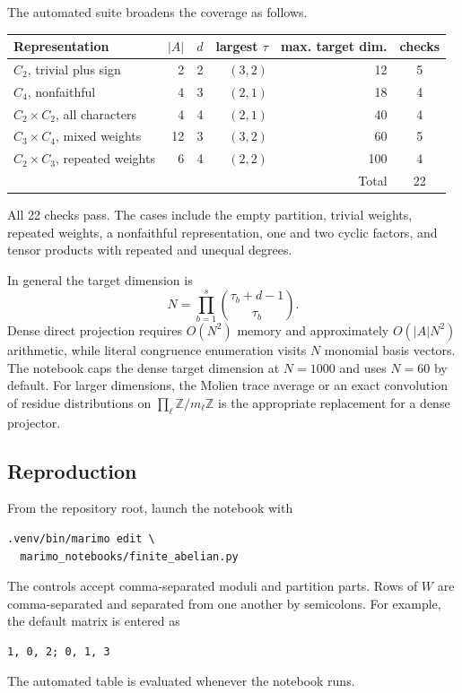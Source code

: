 \documentclass[10pt]{article}
\begin{document}
The automated suite broadens the coverage as follows.
\begin{center}
\small
\begin{tabular}{@{}lrrrrc@{}}
\toprule
Representation & $|A|$ & $d$ & largest $\tau$ & max. target dim. & checks \\
\midrule
$C_2$, trivial plus sign & 2 & 2 & $(3,2)$ & 12 & 5 \\
$C_4$, nonfaithful & 4 & 3 & $(2,1)$ & 18 & 4 \\
$C_2\times C_2$, all characters & 4 & 4 & $(2,1)$ & 40 & 4 \\
$C_3\times C_4$, mixed weights & 12 & 3 & $(3,2)$ & 60 & 5 \\
$C_2\times C_3$, repeated weights & 6 & 4 & $(2,2)$ & 100 & 4 \\
\midrule
\multicolumn{5}{r}{Total} & 22 \\
\bottomrule
\end{tabular}
\end{center}
All 22 checks pass.  The cases include the empty partition, trivial weights,
repeated weights, a nonfaithful representation, one and two cyclic factors,
and tensor products with repeated and unequal degrees.

In general the target dimension is
\begin{equation}\label{finite-abelian-zero-weight-proof:eq:target-dim}
 N=\prod_{b=1}^{s}\binom{\tau_b+d-1}{\tau_b}.
\end{equation}
Dense direct projection requires $O(N^2)$ memory and approximately
$O(|A|N^2)$ arithmetic, while literal congruence enumeration visits $N$
monomial basis vectors.  The notebook caps the dense target dimension at
$N=1000$ and uses $N=60$ by default.  For larger dimensions, the Molien trace
average or an exact convolution of residue distributions on
$\prod_\ell\mathbb Z/m_\ell\mathbb Z$ is the appropriate replacement for a
dense projector.

\subsection{Reproduction}

From the repository root, launch the notebook with
\begin{verbatim}
.venv/bin/marimo edit \
  marimo_notebooks/finite_abelian.py
\end{verbatim}
The controls accept comma-separated moduli and partition parts.  Rows of $W$
are comma-separated and separated from one another by semicolons.  For
example, the default matrix is entered as
\begin{verbatim}
1, 0, 2; 0, 1, 3
\end{verbatim}
The automated table is evaluated whenever the notebook runs.
\endgroup
\end{document}
